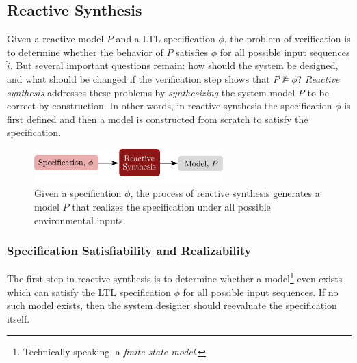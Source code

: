 \subsection{Reactive Synthesis} \label{subsec:reactivesynth}
Given a reactive model $P$ and a LTL specification $\phi$, the problem of verification is to determine whether the behavior of $P$ satisfies $\phi$ for all possible input sequences $\hat{i}$. But several important questions remain: how should the system be designed, and what should be changed if the verification step shows that $P \not \models \phi$? \textit{Reactive synthesis} addresses these problems by \textit{synthesizing} the system model $P$ to be correct-by-construction. In other words, in reactive synthesis the specification $\phi$ is first defined and then a model is constructed from scratch to satisfy the specification.
\begin{figure}[ht]
\begin{center}
\includegraphics[width=0.65\textwidth]{tex/figs/ch25_figs/synthesis.png}
\caption{Given a specification $\phi$, the process of reactive synthesis generates a model $P$ that realizes the specification under all possible environmental inputs.}
\label{fig:formalmethod_synthesis}
\end{center}
\end{figure}

\subsubsection{Specification Satisfiability and Realizability}
The first step in reactive synthesis is to determine whether a model\footnote{Technically speaking, a \textit{finite state model}.} even exists which can satisfy the LTL specification $\phi$ for all possible input sequences. If no such model exists, then the system designer should reevaluate the specification itself.

